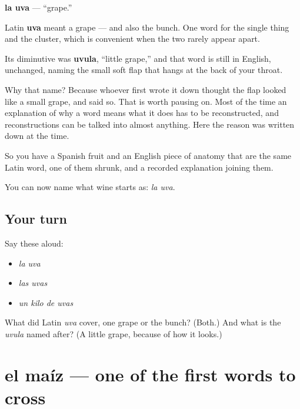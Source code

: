 \begin{cousinweb}
\textbf{la uva} — \textquotedblleft{}grape.\textquotedblright{}

Latin \textbf{uva} meant a grape — and also the bunch. One word for the single thing and the cluster, which is convenient when the two rarely appear apart.

Its diminutive was \textbf{uvula}, \textquotedblleft{}little grape,\textquotedblright{} and that word is still in English, unchanged, naming the small soft flap that hangs at the back of your throat.

Why that name? Because whoever first wrote it down thought the flap looked like a small grape, and said so. That is worth pausing on. Most of the time an explanation of why a word means what it does has to be reconstructed, and reconstructions can be talked into almost anything. Here the reason was written down at the time.

So you have a Spanish fruit and an English piece of anatomy that are the same Latin word, one of them shrunk, and a recorded explanation joining them.
\end{cousinweb}

\begin{grammarlens}[title={What you've built}]
You can now name what wine starts as: \emph{la uva}.
\end{grammarlens}

\subsection*{Your turn}
Say these aloud:

\begin{itemize}
\raggedright
  \item \emph{la uva}
  \item \emph{las uvas}
  \item \emph{un kilo de uvas}
\end{itemize}

\begin{tcolorbox}[breakable,colback=teal!4,colframe=teal!35!black,title={Before you move on}]
What did Latin \emph{uva} cover, one grape or the bunch? (Both.) And what is the \emph{uvula} named after? (A little grape, because of how it looks.)
\end{tcolorbox}
\section[el maíz]{el maíz — one of the first words to cross}

